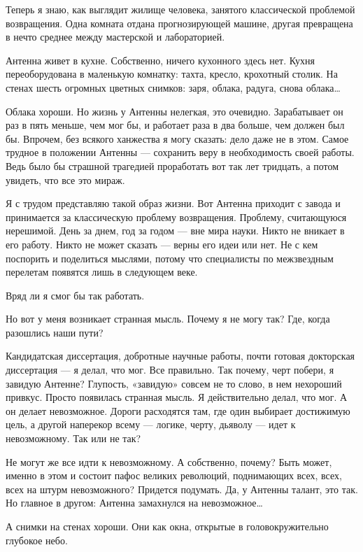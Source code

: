    Теперь  я  знаю,  как  выглядит  жилище  человека,  занятого  классической
   проблемой возвращения. Одна комната  отдана прогнозирующей машине,  другая
   превращена в нечто среднее между мастерской и лабораторией.

   Антенна живет  в  кухне. Собственно,  ничего  кухонного здесь  нет.  Кухня
   переоборудована в маленькую комнатку: тахта, кресло, крохотный столик.  На
   стенах шесть огромных цветных снимков: заря, облака, радуга, снова облака…

   Облака хороши. Но жизнь у Антенны нелегкая, это очевидно. Зарабатывает  он
   раз в пять меньше, чем  мог бы, и работает раза  в два больше, чем  должен
   был бы. Впрочем,  без всякого  ханжества я могу  сказать: дело  даже не  в
   этом. Самое трудное в положении  Антенны — сохранить веру в  необходимость
   своей работы.  Ведь было  бы страшной  трагедией проработать  вот так  лет
   тридцать, а потом увидеть, что все это мираж.

   Я с трудом представляю такой образ жизни. Вот Антенна приходит с завода  и
   принимается за  классическую проблему  возвращения. Проблему,  считающуюся
   нерешимой. День за днем, год за годом — вне мира науки. Никто не вникает в
   его работу. Никто  не может сказать  — верны его  идеи или нет.  Не с  кем
   поспорить и  поделиться мыслями,  потому  что специалисты  по  межзвездным
   перелетам появятся лишь в следующем веке.

   Вряд ли я смог бы так работать.

   Но вот у меня возникает странная мысль.  Почему я не могу так? Где,  когда
   разошлись наши пути?

   Кандидатская  диссертация,   добротные  научные   работы,  почти   готовая
   докторская диссертация — я делал, что мог. Все правильно. Так почему, черт
   побери, я завидую Антенне? Глупость, «завидую»  совсем не то слово, в  нем
   нехороший привкус. Просто появилась странная мысль. Я действительно делал,
   что мог. А он делает невозможное. Дороги расходятся там, где один выбирает
   достижимую цель, а другой наперекор всему — логике, черту, дьяволу —  идет
   к невозможному. Так или не так?

   Не могут же  все идти к  невозможному. А собственно,  почему? Быть  может,
   именно в этом и состоит  пафос великих революций, поднимающих всех,  всех,
   всех на штурм невозможного? Придется  подумать. Да, у Антенны талант,  это
   так. Но главное в другом: Антенна замахнулся на невозможное…

   А снимки  на стенах  хороши. Они  как окна,  открытые в  головокружительно
   глубокое небо.

